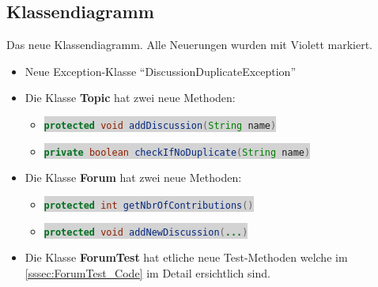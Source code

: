 \documentclass[11pt,ngerman]{article}
\newcommand{\inlinecode}[2]{\colorbox{lightgray}{\lstinline[language=#1]$#2$}}
\newcommand{\quotes}[1]{``#1''}
\begin{document}
     \subsection{Klassendiagramm}
     \label{ssec:Klassendiagramm}
     Das neue Klassendiagramm. Alle Neuerungen wurden mit Violett markiert.
    \begin{itemize}
        \item Neue Exception-Klasse \quotes{DiscussionDuplicateException}
        \item Die Klasse \textbf{Topic} hat zwei neue Methoden:
        \begin{itemize}
             \item \inlinecode{Java}{protected void addDiscussion(String name)}
             \item \inlinecode{Java}{private boolean checkIfNoDuplicate(String name)}
        \end{itemize}
        \item Die Klasse \textbf{Forum} hat zwei neue Methoden:
        \begin{itemize}
            \item \inlinecode{Java}{protected int getNbrOfContributions()}
            \item \inlinecode{Java}{protected void addNewDiscussion(...)}
        \end{itemize}
        \item Die Klasse \textbf{ForumTest} hat etliche neue Test-Methoden welche im \autoref{sssec:ForumTest_Code} im Detail ersichtlich sind.
    \end{itemize}
     \newpage
\end{document}
